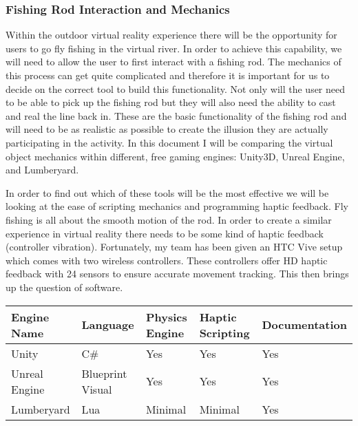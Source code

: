 \documentclass[10pt,journal,compsoc,onecolumn, draftclsnofoot]{IEEEtran}
\begin{document}
\begin{bibunit}
\subsubsection{Fishing Rod Interaction and Mechanics}
Within the outdoor virtual reality experience there will be the opportunity for users to go fly fishing in the virtual river.
In order to achieve this capability, we will need to allow the user to first interact with a fishing rod.
The mechanics of this process can get quite complicated and therefore it is important for us to decide on the correct tool to build this functionality.
Not only will the user need to be able to pick up the fishing rod but they will also need the ability to cast and real the line back in.
These are the basic functionality of the fishing rod and will need to be as realistic as possible to create the illusion they are actually participating in the activity.
In this document I will be comparing the virtual object mechanics within different, free gaming engines: Unity3D, Unreal Engine, and Lumberyard.

In order to find out which of these tools will be the most effective we will be looking at the ease of scripting mechanics and programming haptic feedback.
Fly fishing is all about the smooth motion of the rod.
In order to create a similar experience in virtual reality there needs to be some kind of haptic feedback (controller vibration).
Fortunately, my team has been given an HTC Vive setup which comes with two wireless controllers.
These controllers offer HD haptic feedback with 24 sensors to ensure accurate movement tracking\cite{htc_corporation}.
This then brings up the question of software.

\vspace{2mm}
\begin{table}[h!]
\centering
  \begin{tabu} to 1.0\textwidth { | X[l] || X[c] | X[c] | X[c] | X[c] |  }
  \hline
  Engine Name & Language & Physics Engine & Haptic Scripting & Documentation\\
  \hline
  Unity  & C\# & Yes & Yes & Yes\\
  Unreal Engine &   Blueprint Visual  & Yes & Yes & Yes\\
  Lumberyard & Lua & Minimal & Minimal & Yes \\
  \hline
  \end{tabu}
\end{table}
\vspace{2mm}


\end{bibunit}
\end{document}
